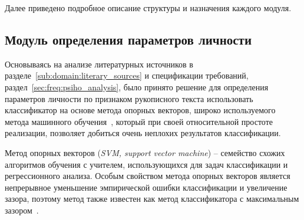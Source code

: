 Далее приведено подробное описание структуры и назначения каждого модуля.


\subsection{Модуль определения параметров личности}
\label{sec:architecture:personal_parameters}
Основываясь на анализе литературных источников в разделе~\ref{sub:domain:literary_sources} и спецификации требований, раздел~\ref{sec:freq:psiho_analysis}, было принято решение для определения параметров личности по признаком рукописного текста использовать классификатор на основе метода опорных векторов, широко используемого метода машинного обучения~\cite{manning_ir}, который при своей относительной простоте реализации, позволяет добиться очень неплохих результатов классификации.

Метод опорных векторов (\emph{SVM, support vector machine}) – семейство схожих алгоритмов обучения с учителем, использующихся для задач классификации и регрессионного анализа. Особым свойством метода опорных векторов является непрерывное уменьшение эмпирической ошибки классификации и увеличение зазора, поэтому метод также известен как метод классификатора с максимальным зазором~\cite{mitchell_ml, wiki_SVM}.

